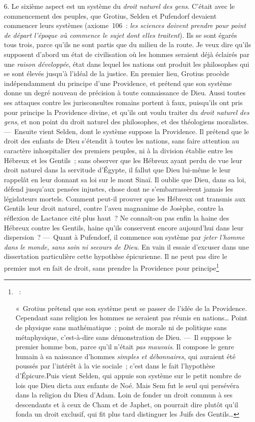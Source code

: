 \documentclass[french,twoside]{book} %
\begin{document}
 6. Le sixième aspect est un système du {\itshape droit naturel des gens}. C’était avec le commencement des peuples, que Grotius, Selden et Pufendorf devaient commencer leurs systèmes (axiome 106 : {\itshape les sciences doivent prendre pour point de départ l’époque où commence le sujet dont elles traitent}). Ils se sont égarés tous trois, parce qu’ils ne sont partis que du milieu de la route. Je veux dire qu’ils supposent d’abord un état de civilisation où les hommes seraient déjà éclairés par une {\itshape raison développée}, état dans lequel les nations ont produit les philosophes qui se sont élevés jusqu’à l’idéal de la justice. En premier lieu, Grotius procède indépendamment du principe d’une Providence, et prétend que son système donne un degré nouveau de précision à toute connaissance de Dieu. Aussi toutes ses attaques contre les jurisconsultes romains portent à faux, puisqu’ils ont pris pour principe la Providence divine, et qu’ils ont voulu traiter du {\itshape droit naturel des gens}, et non point du droit naturel des philosophes, et des théologiens moralistes. — Ensuite vient Selden, dont le système suppose la Providence. Il prétend que le droit des enfants de Dieu s’étendit à toutes les nations, sans faire attention au caractère inhospitalier des premiers peuples, ni à la division établie entre les Hébreux et les Gentils ; sans observer que les Hébreux ayant perdu de vue leur droit naturel dans la servitude d’Égypte, il fallut que Dieu lui-même le leur rappelât en leur donnant sa loi sur le mont Sinaï. Il oublie que Dieu,  dans sa loi, défend jusqu’aux pensées injustes, chose dont ne s’embarrassèrent jamais les législateurs mortels. Comment peut-il prouver que les Hébreux ont transmis aux Gentils leur droit naturel, contre l’aveu magnanime de Josèphe, contre la réflexion de Lactance cité plus haut ? Ne connaît-on pas enfin la haine des Hébreux contre les Gentils, haine qu’ils conservent encore aujourd’hui dans leur dispersion ? — Quant à Pufendorf, il commence son système par {\itshape jeter l’homme dans le monde, sans soin ni secours de Dieu}. En vain il essaie d’excuser dans une dissertation particulière cette hypothèse épicurienne. Il ne peut pas dire le premier mot en fait de droit, sans prendre la Providence pour principe\footnote{ :\par
\noindent « Grotius prétend que son système peut se passer de l’idée de la Providence. Cependant sans religion les hommes ne seraient pas réunis en nations… Point de physique sans mathématique ; point de morale ni de politique sans métaphysique, c’est-à-dire sans démonstration de Dieu. — Il suppose le premier homme bon, parce qu’il n’était {\itshape pas mauvais}. Il compose le genre humain à sa naissance d’hommes {\itshape simples et débonnaires}, qui auraient été poussés par l’intérêt à la vie sociale ; c’est dans le fait l’hypothèse d’Épicure.Puis vient Selden, qui appuie son système sur le petit nombre de lois que Dieu dicta aux enfants de Noé. Mais Sem fut le seul qui persévéra dans la religion du Dieu d’Adam. Loin de fonder un droit commun à ses descendants et à ceux de Cham et de Japhet, on pourrait dire plutôt qu’il fonda un droit exclusif, qui fit plus tard distinguer les Juifs des Gentils…\par
}
\end{document}
